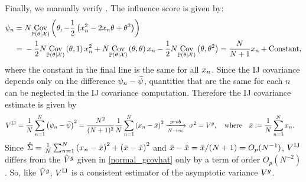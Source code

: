 Finally, we manually verify . The influence score is given by:
%
\begin{align*}
%
\infl_n ={}& N \cov{\post}{
    \theta, -\frac{1}{2} \left(\x_n^2 - 2\x_n \theta + \theta^2 \right)} \\
={}&
 -\frac{1}{2}  N \cov{\post}{\theta, 1} \x_n^2 +
 N \cov{\post}{\theta, \theta} \x_n
 -\frac{1}{2} N  \cov{\post}{\theta, \theta^2}
={} \frac{N}{N+1} \x_n + \textrm{Constant},
%
\end{align*}
%
where the constant in the final line is the same for all $x_n$.  Since the IJ covariance
depends only on the difference $\psi_n - \bar{\psi}$, quantities that are the
same for each $n$ can be neglected in the IJ covariance computation. Therefore
the IJ covariance estimate is given by
%
\begin{align*}
%
\gcovij ={}& \meann \left(\infl_n - \bar{\infl} \right)^2
={} \frac{N^2}{(N + 1)^2} \meann \left(\x_n - \bar{\x}\right)^2
\plim \sigma^2 = \gcovtrue,
\quad\textrm{where}\quad
\bar{\x} := \meann \x_n.
%
\end{align*}
%
Since $\hat\Sigma = \frac{1}{N}\sum_{n=1}^N \left(x_n - \bar{x}\right)^2 + \left(\bar{x} -
\tilde{x}\right)^2$ and $\bar{x} - \tilde{x} = \bar{x} / (N + 1) = O_p(N^{-1})$,
$V^{\mathrm{IJ}}$ differs from the $\hat{V}^{g}$ given in \eqref{normal_gcovhat} only by
a term of order $O_p(N^{-2})$.  So, like $\hat{V}^{g}$, $V^{\mathrm{IJ}}$ is a
consistent estimator of the asymptotic variance $V^g$.
